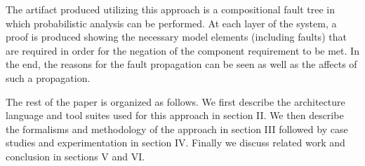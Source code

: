 The artifact produced utilizing this approach is a compositional fault tree in which probabilistic analysis can be performed. At each layer of the system, a proof is produced showing the necessary model elements (including faults) that are required in order for the negation of the component requirement to be met. In the end, the reasons for the fault propagation can be seen as well as the affects of such a propagation. 


The rest of the paper is organized as follows. We first describe the architecture language and tool suites used for this approach in section II. We then describe the formalisms and methodology of the approach in section III followed by case studies and experimentation in section IV. Finally we discuss related work and conclusion in sections V and VI.  

